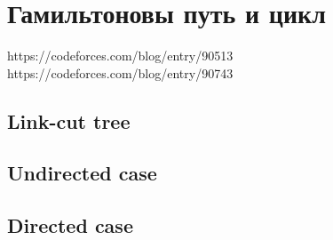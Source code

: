 \section{Гамильтоновы путь и цикл}
https://codeforces.com/blog/entry/90513
https://codeforces.com/blog/entry/90743
\subsection{Link-cut tree}

\subsection{Undirected case}

\subsection{Directed case}
